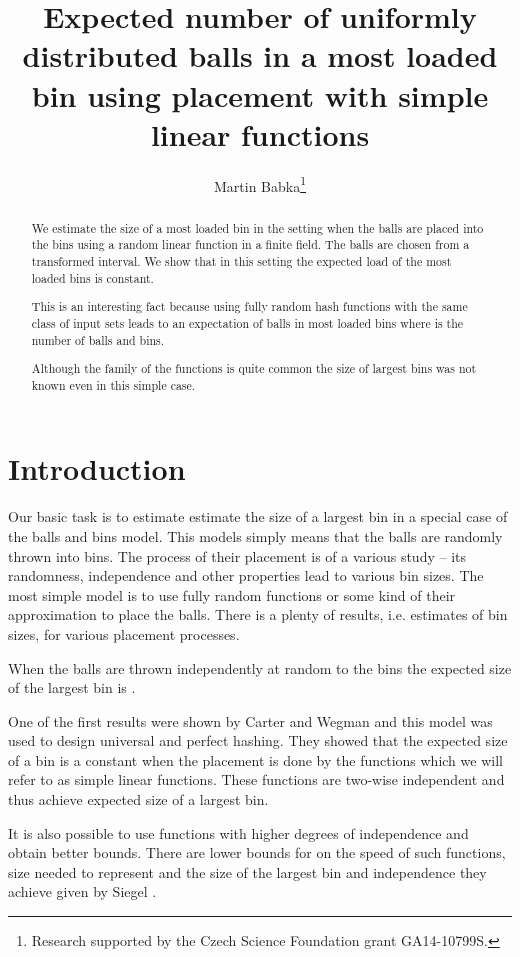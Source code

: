 \documentclass{article}
\title{Expected number of uniformly distributed balls in a most loaded bin using placement with simple linear functions}
\author{Martin Babka\thanks{Research supported by the Czech Science Foundation grant GA14-10799S.}}
\begin{document}
\maketitle

\begin{abstract}
We estimate the size of a most loaded bin in the setting when the balls are placed into the bins using a random linear function in a finite field.
The balls are chosen from a transformed interval. 
We show that in this setting the expected load of the most loaded bins is constant.

This is an interesting fact because using fully random hash functions with the same class of input sets leads to an expectation of  balls in most loaded bins where  is the number of balls and bins.

Although the family of the functions is quite common the size of largest bins was not known even in this simple case.
\end{abstract}

\section{Introduction}

Our basic task is to estimate estimate the size of a largest bin in a special case of the balls and bins model. This models simply means that the balls are randomly thrown into bins. The process of their placement is of a various study -- its randomness, independence and other properties lead to various bin sizes.
The most simple model is to use fully random functions or some kind of their approximation to place the balls. There is a plenty of results, i.e. estimates of bin sizes, for various placement processes.

When the balls are thrown independently at random to the bins the expected size of the largest bin is .

One of the first results were shown by Carter and Wegman \cite{cw} and this model was used to design universal and perfect hashing. They showed that the expected size of a bin is a constant when the placement is done by the functions which we will refer to as simple linear functions. These functions are two-wise independent and thus achieve  expected size of a largest bin.

It is also possible to use functions with higher degrees of independence and obtain better bounds. There are lower bounds for on the speed of such functions, size needed to represent and the size of the largest bin and independence they achieve given by Siegel \cite{siegel}.
\end{document}
